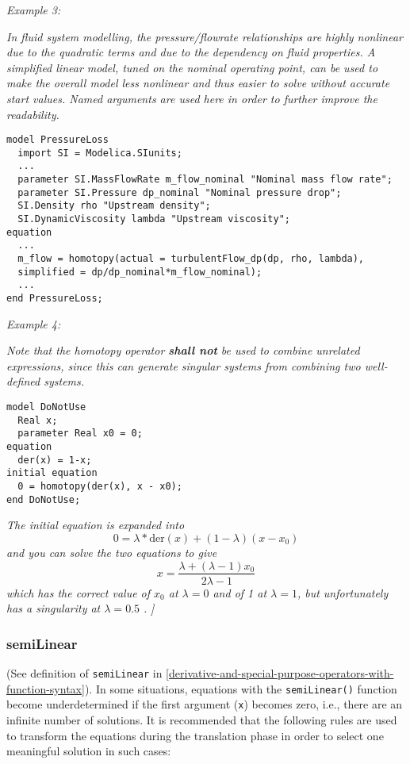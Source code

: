\emph{Example 3:}

\emph{In fluid system modelling, the pressure/flowrate relationships are
highly nonlinear due to the quadratic terms and due to the dependency on
fluid properties. A simplified linear model, tuned on the nominal
operating point, can be used to make the overall model less nonlinear
and thus easier to solve without accurate start values. Named arguments
are used here in order to further improve the readability.}

\begin{lstlisting}[language=modelica]
model PressureLoss
  import SI = Modelica.SIunits;
  ...
  parameter SI.MassFlowRate m_flow_nominal "Nominal mass flow rate";
  parameter SI.Pressure dp_nominal "Nominal pressure drop";
  SI.Density rho "Upstream density";
  SI.DynamicViscosity lambda "Upstream viscosity";
equation
  ...
  m_flow = homotopy(actual = turbulentFlow_dp(dp, rho, lambda),
  simplified = dp/dp_nominal*m_flow_nominal);
  ...
end PressureLoss;
\end{lstlisting}

\emph{Example 4:}

\emph{Note that the homotopy operator \textbf{shall not} be used to
combine unrelated expressions, since this can generate singular systems
from combining two well-defined systems.}

\begin{lstlisting}[language=modelica]
model DoNotUse
  Real x;
  parameter Real x0 = 0;
equation
  der(x) = 1-x;
initial equation
  0 = homotopy(der(x), x - x0);
end DoNotUse;
\end{lstlisting}

\emph{The initial equation is expanded into}
$$ 0 = \lambda*\mathrm{der}(x)+(1-\lambda)(x-x_0)$$
\emph{and you can solve the two equations to give}
$$ x=\frac{\lambda+(\lambda-1)x_0}{2\lambda-1}$$
\emph{which has the correct value of $x_0$ at $\lambda = 0$ and of 1 at $\lambda= 1$, but unfortunately has a singularity at $\lambda = 0.5 $ .}
\emph{{]}}

\subsubsection{semiLinear}

(See definition of \lstinline!semiLinear! in \autoref{derivative-and-special-purpose-operators-with-function-syntax}). In some situations,
equations with the \lstinline!semiLinear()! function become underdetermined if the
first argument (\lstinline!x!) becomes zero, i.e., there are an infinite number of
solutions. It is recommended that the following rules are used to
transform the equations during the translation phase in order to select
one meaningful solution in such cases:

